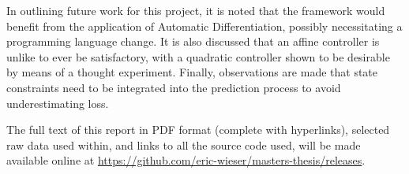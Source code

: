 \documentclass[main.tex]{subfiles}
\begin{document}
In outlining future work for this project, it is noted that the {\Pilco} framework would benefit from the application of Automatic Differentiation, possibly necessitating a programming language change.
It is also discussed that an affine controller is unlike to ever be satisfactory, with a quadratic controller shown to be desirable by means of a thought experiment.
Finally, observations are made that state constraints need to be integrated into the prediction process to avoid underestimating loss.

The full text of this report in PDF format (complete with hyperlinks), selected raw data used within, and links to all the source code used, will be made available online at \url{https://github.com/eric-wieser/masters-thesis/releases}.
\end{document}
